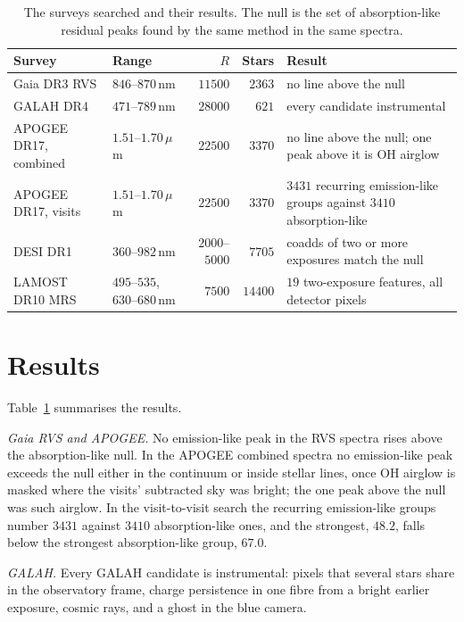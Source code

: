 \documentclass[3p,11pt]{elsarticle}
\newcommand{\um}{\,$\mu$m}
\begin{document}
\begin{table}[t]
\centering\small
\setlength{\tabcolsep}{4pt}
\caption{The surveys searched and their results. The null is the set of absorption-like
residual peaks found by the same method in the same spectra.}
\label{tab:surveys}
\begin{tabular}{l l r r >{\raggedright\arraybackslash}p{}}
\toprule
Survey & Range & $R$ & Stars & Result \\
\midrule
Gaia DR3 RVS & $846$--$870$\,nm & $11500$ & $2363$ & no line above the null \\
GALAH DR4 & $471$--$789$\,nm & $28000$ & $621$ & every candidate instrumental \\
APOGEE DR17, combined & $1.51$--$1.70$\um & $22500$ & $3370$ & no line above the null; one peak above it is OH airglow \\
APOGEE DR17, visits & $1.51$--$1.70$\um & $22500$ & $3370$ & $3431$ recurring emission-like groups against $3410$ absorption-like \\
DESI DR1 & $360$--$982$\,nm & $2000$--$5000$ & $7705$ & coadds of two or more exposures match the null \\
LAMOST DR10 MRS & $495$--$535$, $630$--$680$\,nm & $7500$ & $14400$ & $19$ two-exposure features, all detector pixels \\
\bottomrule
\end{tabular}
\end{table}

\section{Results}\label{sec:results}

Table~\ref{tab:surveys} summarises the results.

\emph{Gaia RVS and APOGEE.} No emission-like peak in the RVS spectra rises above the
absorption-like null. In the APOGEE combined spectra no emission-like peak exceeds the
null either in the continuum or inside stellar lines, once OH airglow is masked where the
visits' subtracted sky was bright; the one peak above the null was such airglow. In the
visit-to-visit search the recurring emission-like groups number $3431$ against $3410$
absorption-like ones, and the strongest, $48.2$, falls below the strongest absorption-like
group, $67.0$.

\emph{GALAH.} Every GALAH candidate is instrumental: pixels that several stars share in
the observatory frame, charge persistence in one fibre from a bright earlier exposure,
cosmic rays, and a ghost in the blue camera.
\end{document}
